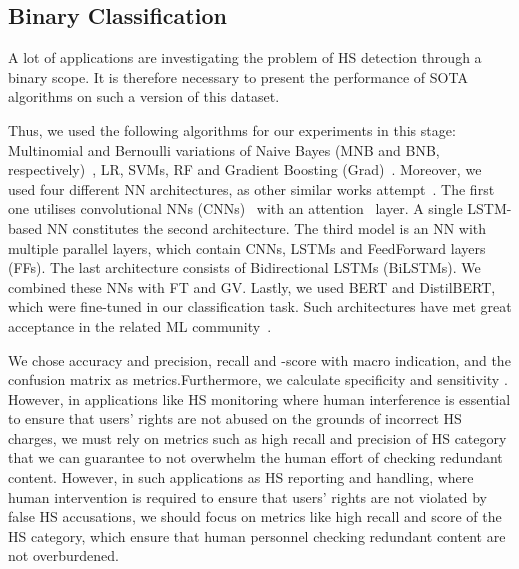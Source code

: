 \documentclass{article}
\begin{document}
\iffalse
\begin{itemize}
    \item FastText (FT)~\cite{fastText}: 2 million word vectors trained on Common Crawl with 600B tokens\footnote{\url{https://dl.fbaipublicfiles.com/fasttext/vectors-english/crawl-300d-2M.vec.zip}}
    \item GloVe (GV)~\cite{glove}: Common Crawl with 42B tokens, 1.9M vocab, uncased, 300d vectors, 1.75 GB download\footnote{\url{http://nlp.stanford.edu/data/glove.42B.300d.zip}}
    \item FastText \& GloVe concatenated
    \item Bert (BERT)~\cite{bert}: pre-trained language model ``bert\_u-ncased\_L-12\_H-768\_A-12'' trained on English Wikipedia and the BookCorpus
\end{itemize}
\fi

\subsection{Binary Classification}
A lot of applications are investigating the problem of HS detection through a binary scope. It is therefore necessary to present the performance of SOTA algorithms on such a version of this dataset.

Thus, we used the following algorithms for our experiments in this stage: Multinomial and Bernoulli variations of Naive Bayes (MNB and BNB, respectively)~\cite{NB2}, LR, SVMs, RF and Gradient Boosting (Grad)~\cite{GBoost}. Moreover, we used four different NN architectures, as other similar works attempt~\cite{DBLP:journals/corr/abs-2003-07459}. The first one utilises convolutional NNs (CNNs)~\cite{CNNnets} with an attention~\cite{attentionLayers} layer. A single LSTM-based NN constitutes the second architecture. The third model is an NN with multiple parallel layers, which contain CNNs, LSTMs and FeedForward layers (FFs). The last architecture consists of Bidirectional LSTMs (BiLSTMs). We combined these NNs with FT and GV. Lastly, we used BERT and DistilBERT, which were fine-tuned in our classification task. Such architectures have met great acceptance in the related ML community~\cite{DBLP:conf/clic-it/PolignanoBGSB19,yang-etal-2019-exploring-deep}.

We chose accuracy and precision, recall and -score with macro indication, and the confusion matrix as metrics.Furthermore, we calculate specificity  and sensitivity . However, in applications like HS monitoring where human interference is essential to ensure that users' rights are not abused on the grounds of incorrect HS charges, we must rely on metrics such as high recall and precision of HS category that we can guarantee to not overwhelm the human effort of checking redundant content. However, in such applications as HS reporting and handling, where human intervention is required to ensure that users' rights are not violated by false HS accusations, we should focus on metrics like high recall and  score of the HS category, which ensure that human personnel checking redundant content are not overburdened.
\end{document}
